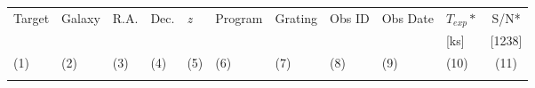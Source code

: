 \documentclass[iop]{emulateapj-rtx4}
\begin{document}
\begin{table}[ht]\footnotesize
\begin{center}
\begin{tabular}{l l l l l l l l l l c}
 \hline \hline
  Target 		& Galaxy		& R.A. 		& Dec. 		& \textit{z}		 & Program 	  & Grating 	  & Obs ID 	    & Obs Date		& $T_{exp}*$	& S/N*  \\ 
  	    		& 	       		&	  		& 		  	 & 		    	  & 		  	  & 		  	   & 		     	    & 				& [ks]		& [1238] \\ 
 \scriptsize (1)  & \scriptsize (2) & \scriptsize (3) & \scriptsize (4) & \scriptsize (5) & \scriptsize (6) & \scriptsize  (7) & \scriptsize (8) & \scriptsize (9) 	& \scriptsize (10) & \scriptsize (11)  \\ \hline \hline
\\
    

\end{tabular}
\end{center}
\end{table}
\end{document}
